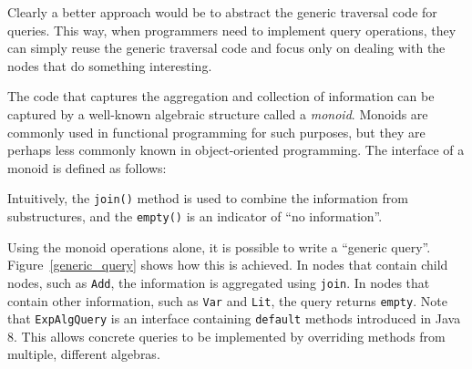 Clearly a better approach would be to abstract the generic traversal
code for queries. This way, when programmers need to implement query
operations, they can simply reuse the generic traversal code and
focus only on dealing with the nodes that do something interesting.



The code that captures the aggregation and collection of information
can be captured by a well-known algebraic structure called a
\emph{monoid}. Monoids are commonly used in functional programming
for such purposes, but they are perhaps less commonly known in
object-oriented programming.  The interface of a monoid is defined as follows:
\begin{quote}
\end{quote}
Intuitively, the \lstinline{join()} method is
used to combine the information from substructures, and the
\lstinline{empty()} is an indicator of ``no information''.

Using the monoid operations alone, it is possible to write a ``generic
query''. Figure~\ref{generic_query} shows how this is achieved. In
nodes that contain child nodes, such as \lstinline{Add}, the
information is aggregated using \lstinline{join}. In nodes that
contain other information, such as \lstinline{Var} and
\lstinline{Lit}, the query returns \lstinline{empty}.
Note that \lstinline{ExpAlgQuery} is an interface containing \lstinline{default} methods introduced in Java 8.
This allows concrete queries to be implemented by overriding methods from multiple, different algebras. 

